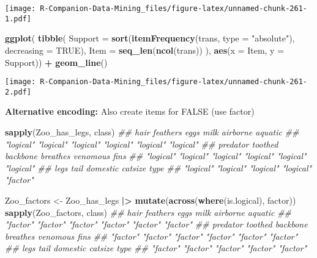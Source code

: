 \documentclass[
  notitlepage]{book}
\newenvironment{Shaded}{\begin{snugshade}}{\end{snugshade}}
\newcommand{\CommentTok}[1]{\textcolor[rgb]{0.56,0.35,0.01}{\textit{#1}}}
\newcommand{\DataTypeTok}[1]{\textcolor[rgb]{0.13,0.29,0.53}{#1}}
\newcommand{\ErrorTok}[1]{\textcolor[rgb]{0.64,0.00,0.00}{\textbf{#1}}}
\newcommand{\KeywordTok}[1]{\textcolor[rgb]{0.13,0.29,0.53}{\textbf{#1}}}
\newcommand{\NormalTok}[1]{#1}
\newcommand{\OperatorTok}[1]{\textcolor[rgb]{0.81,0.36,0.00}{\textbf{#1}}}
\newcommand{\OtherTok}[1]{\textcolor[rgb]{0.56,0.35,0.01}{#1}}
\newcommand{\StringTok}[1]{\textcolor[rgb]{0.31,0.60,0.02}{#1}}
\begin{document}
\texttt{[image: R-Companion-Data-Mining\_files/figure-latex/unnamed-chunk-261-1.pdf]}

\begin{Shaded}
\begin{Highlighting}[]
\KeywordTok{ggplot}\NormalTok{(}
  \KeywordTok{tibble}\NormalTok{(}
    \DataTypeTok{Support =} \KeywordTok{sort}\NormalTok{(}\KeywordTok{itemFrequency}\NormalTok{(trans, }\DataTypeTok{type =} \StringTok{"absolute"}\NormalTok{), }
                   \DataTypeTok{decreasing =} \OtherTok{TRUE}\NormalTok{),}
    \DataTypeTok{Item =} \KeywordTok{seq\_len}\NormalTok{(}\KeywordTok{ncol}\NormalTok{(trans))}
\NormalTok{  ), }\KeywordTok{aes}\NormalTok{(}\DataTypeTok{x =}\NormalTok{ Item, }\DataTypeTok{y =}\NormalTok{ Support)) }\OperatorTok{+}\StringTok{ }
\StringTok{  }\KeywordTok{geom\_line}\NormalTok{()}
\end{Highlighting}
\end{Shaded}

\texttt{[image: R-Companion-Data-Mining\_files/figure-latex/unnamed-chunk-261-2.pdf]}

\textbf{Alternative encoding:} Also create items for FALSE (use factor)

\begin{Shaded}
\begin{Highlighting}[]
\KeywordTok{sapply}\NormalTok{(Zoo\_has\_legs, class)}
\CommentTok{\#\#      hair  feathers      eggs      milk  airborne   aquatic }
\CommentTok{\#\# "logical" "logical" "logical" "logical" "logical" "logical" }
\CommentTok{\#\#  predator   toothed  backbone  breathes  venomous      fins }
\CommentTok{\#\# "logical" "logical" "logical" "logical" "logical" "logical" }
\CommentTok{\#\#      legs      tail  domestic   catsize      type }
\CommentTok{\#\# "logical" "logical" "logical" "logical"  "factor"}
\end{Highlighting}
\end{Shaded}

\begin{Shaded}
\begin{Highlighting}[]
\NormalTok{Zoo\_factors \textless{}{-}}\StringTok{ }\NormalTok{Zoo\_has\_legs }\OperatorTok{|}\ErrorTok{\textgreater{}}\StringTok{ }
\StringTok{  }\KeywordTok{mutate}\NormalTok{(}\KeywordTok{across}\NormalTok{(}\KeywordTok{where}\NormalTok{(is.logical), factor))}
\KeywordTok{sapply}\NormalTok{(Zoo\_factors, class)}
\CommentTok{\#\#     hair feathers     eggs     milk airborne  aquatic }
\CommentTok{\#\# "factor" "factor" "factor" "factor" "factor" "factor" }
\CommentTok{\#\# predator  toothed backbone breathes venomous     fins }
\CommentTok{\#\# "factor" "factor" "factor" "factor" "factor" "factor" }
\CommentTok{\#\#     legs     tail domestic  catsize     type }
\CommentTok{\#\# "factor" "factor" "factor" "factor" "factor"}
\end{Highlighting}
\end{Shaded}
\end{document}
